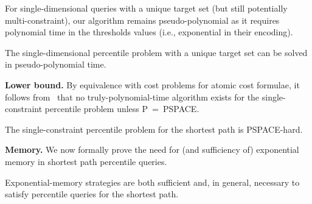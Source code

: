 \documentclass{llncs}
\newcommand\PTIME{\textrm{\sf P}}
\newcommand\PSPACE{\textrm{\sf PSPACE}}
\begin{document}
For single-dimensional queries with a unique target set (but still potentially multi-constraint), our algorithm remains pseudo-polynomial as it requires polynomial time in the thresholds values (i.e., exponential in their encoding).
\begin{corollary}
\label{cor:sp_alg}
The single-dimensional percentile problem with a unique target set can be solved in pseudo-polynomial time.
\end{corollary}


\noindent\textbf{Lower bound.}
By equivalence with cost problems for atomic cost formulae, it follows
from~\cite[Theorem 7]{HaaseK14} that no truly-polynomial-time algorithm
exists for the single-constraint percentile problem unless \PTIME~=~\PSPACE.

\begin{lemma}
The single-constraint percentile problem for the shortest path is \PSPACE-hard.
\end{lemma}

\smallskip\noindent\textbf{Memory.} 
We now formally prove the need for (and sufficiency of) exponential memory in shortest path percentile queries.

\begin{lemma}
\label{lem:spmemory}
Exponential-memory strategies are both sufficient and, in general, necessary to satisfy percentile queries for the shortest path.
\end{lemma}
\end{document}
